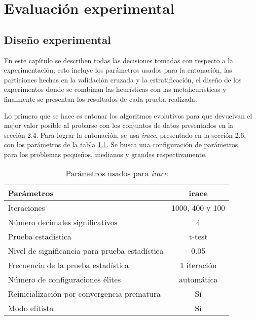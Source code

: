 \chapter{Evaluación experimental}
\label{capitulo3}

\section{Diseño experimental}

En este capítulo se describen todas las decisiones tomadas con respecto a la experimentación; esto incluye los parámetros usados para la entonación, las particiones hechas en la validación cruzada y la estratificación, el diseño de los experimentos donde se combinan las heurísticas con las metaheurísticas y finalmente se presentan los resultados de cada prueba realizada. 

Lo primero que se hace es entonar los algoritmos evolutivos para que devuelvan el mejor valor posible al probarse con los conjuntos de datos presentados en la sección 2.4. Para lograr la entonación, se usa \emph{irace}, presentado en la sección 2.6, con los parámetros de la tabla \ref{irace-param}. Se busca una configuración de parámetros para los problemas pequeños, medianos y grandes respectivamente.

\begin{table}[]
\centering
\begin{tabular}{l c}
\hline
Parámetros & irace \\
\hline
\hline
Iteraciones                                 &  1000, 400 y 100\\
Número decimales significativos             &    4            \\
Prueba estadística                          &  t-test         \\
Nivel de significancia para prueba estadística  &  0.05           \\
Frecuencia de la prueba estadística         &    1 iteración  \\
Número de configuraciones élites            &  automática     \\
Reinicialización por convergencia prematura &     Sí          \\
Modo elitista                               &     Sí          \\

\hline
\end{tabular}
\caption{Parámetros usados para \emph{irace}}
\label{irace-param}
\end{table}

